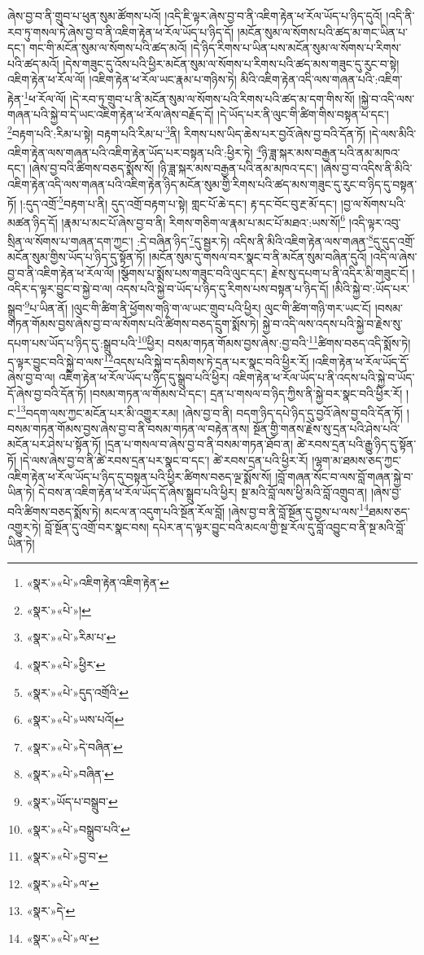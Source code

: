 ཞེས་བྱ་བ་ནི་གྲུབ་པ་ཕུན་སུམ་ཚོགས་པའོ། །འདི་ཇི་ལྟར་ཞེས་བྱ་བ་ནི་འཇིག་རྟེན་ཕ་རོལ་ཡོད་པ་ཉིད་དུའོ། །འདི་ནི་རབ་ཏུ་གསལ་ཏེ་ཞེས་བྱ་བ་ནི་འཇིག་རྟེན་ཕ་རོལ་ཡོད་པ་ཉིད་དོ། །མངོན་སུམ་ལ་སོགས་པའི་ཚད་མ་གང་ཡིན་པ་དང་། གང་གི་མངོན་སུམ་ལ་སོགས་པའི་ཚད་མའོ། །དེ་ཉིད་རིགས་པ་ཡིན་པས་མངོན་སུམ་ལ་སོགས་པ་རིགས་པའི་ཚད་མའོ། །དེས་གཟུང་དུ་འོས་པའི་ཕྱིར་མངོན་སུམ་ལ་སོགས་པ་རིགས་པའི་ཚད་མས་གཟུང་དུ་རུང་བ་སྟེ། འཇིག་རྟེན་ཕ་རོལ་ལོ། །འཇིག་རྟེན་ཕ་རོལ་ཡང་རྣམ་པ་གཉིས་ཏེ། མིའི་འཇིག་རྟེན་འདི་ལས་གཞན་པའི་:འཇིག་རྟེན་\footnote{«སྣར་»«པེ་»འཇིག་རྟེན་འཇིག་རྟེན་}ཕ་རོལ་ལོ། །དེ་རབ་ཏུ་གྲུབ་པ་ནི་མངོན་སུམ་ལ་སོགས་པའི་རིགས་པའི་ཚད་མ་དག་གིས་སོ། །སྐྱེ་བ་འདི་ལས་གཞན་པའི་སྐྱེ་བ་དེ་ཡང་འཇིག་རྟེན་ཕ་རོལ་ཞེས་བརྗོད་དོ། །དེ་ཡོད་པར་ནི་ལུང་གི་ཚིག་གིས་བསྟན་པ་དང་། \footnote{«སྣར་»«པེ་»།  }བརྟག་པའི་:རིམ་པ་སྟེ། བརྟག་པའི་རིམ་པ་\footnote{«སྣར་»«པེ་»རིམ་པ་}ནི། རིགས་པས་ཡིད་ཆེས་པར་བྱའོ་ཞེས་བྱ་བའི་དོན་ཏོ། །དེ་ལས་མིའི་འཇིག་རྟེན་ལས་གཞན་པའི་འཇིག་རྟེན་ཡོད་པར་བསྟན་པའི་:ཕྱིར་ཏེ། \footnote{«སྣར་»«པེ་»ཕྱིར་}ཉི་ཟླ་སྐར་མས་བརྒྱན་པའི་ནམ་མཁའ་དང་། །ཞེས་བྱ་བའི་ཚིགས་བཅད་སྨོས་སོ། །ཉི་ཟླ་སྐར་མས་བརྒྱན་པའི་ནམ་མཁའ་དང་། །ཞེས་བྱ་བ་འདིས་ནི་མིའི་འཇིག་རྟེན་འདི་ལས་གཞན་པའི་འཇིག་རྟེན་ཉིད་མངོན་སུམ་གྱི་རིགས་པའི་ཚད་མས་གཟུང་དུ་རུང་བ་ཉིད་དུ་བསྟན་ཏོ། །:དུད་འགྲོ་\footnote{«སྣར་»«པེ་»དུད་འགྲོའི་}བརྟག་པ་ནི། དུད་འགྲོ་བརྟག་པ་སྟེ། གླང་པོ་ཆེ་དང་། རྟ་དང་བོང་བུ་རྔ་མོ་དང་། །བྱ་ལ་སོགས་པའི་མཚན་ཉིད་དོ། །རྣམ་པ་མང་པོ་ཞེས་བྱ་བ་ནི། རིགས་གཅིག་ལ་རྣམ་པ་མང་པོ་མཐའ་:ཡས་སོ།\footnote{«སྣར་»«པེ་»ཡས་པའོ།} །འདི་ལྟར་འབུ་སྲིན་ལ་སོགས་པ་གཞན་དག་ཀྱང་། :དེ་བཞིན་ཉིད་\footnote{«སྣར་»«པེ་»དེ་བཞིན་}དུ་སྦྱར་ཏེ། འདིས་ནི་མིའི་འཇིག་རྟེན་ལས་གཞན་\footnote{«སྣར་»«པེ་»བཞིན་}དུ་དུད་འགྲོ་མངོན་སུམ་གྱིས་ཡོད་པ་ཉིད་དུ་སྟོན་ཏོ། །མངོན་སུམ་དུ་གསལ་བར་སྣང་བ་ནི་མངོན་སུམ་བཞིན་དུའོ། །འདི་ལ་ཞེས་བྱ་བ་ནི་འཇིག་རྟེན་ཕ་རོལ་ལོ། །སྩོགས་པ་སྨོས་པས་གཟུང་བའི་ལུང་དང་། རྗེས་སུ་དཔག་པ་ནི་འདིར་མི་གཟུང་ངོ། །འདིར་ད་ལྟར་བྱུང་བ་སྐྱེ་བ་ལ། འདས་པའི་སྐྱེ་བ་ཡོད་པ་ཉིད་དུ་རིགས་པས་བསྟན་པ་ཉིད་དོ། །མིའི་སྐྱེ་བ་:ཡོད་པར་སྒྲུབ་\footnote{«སྣར་»ཡོད་པ་བསྒྲུབ་}པ་ཡིན་ནོ། །ལུང་གི་ཚིག་ནི་ཕྱོགས་གཉི་ག་ལ་ཡང་གྲུབ་པའི་ཕྱིར། ལུང་གི་ཚིག་གཉི་གར་ཡང་ངོ། །བསམ་གཏན་གོམས་བྱས་ཞེས་བྱ་བ་ལ་སོགས་པའི་ཚིགས་བཅད་དྲུག་སྨོས་ཏེ། སྐྱེ་བ་འདི་ལས་འདས་པའི་སྐྱེ་བ་རྗེས་སུ་དཔག་པས་ཡོད་པ་ཉིད་དུ་:སྒྲུབ་པའི་\footnote{«སྣར་»«པེ་»བསྒྲུབ་པའི་}ཕྱིར། བསམ་གཏན་གོམས་བྱས་ཞེས་:བྱ་བའི་\footnote{«སྣར་»«པེ་»བྱ་བ་}ཚིགས་བཅད་འདི་སྨོས་ཏེ། ད་ལྟར་བྱུང་བའི་སྐྱེ་བ་ལས་\footnote{«སྣར་»«པེ་»ལ་}འདས་པའི་སྐྱེ་བ་དམིགས་ཏེ་དྲན་པར་སྣང་བའི་ཕྱིར་རོ། །འཇིག་རྟེན་ཕ་རོལ་ཡོད་དོ་ཞེས་བྱ་བ་ལ། འཇིག་རྟེན་ཕ་རོལ་ཡོད་པ་ཉིད་དུ་སྒྲུབ་པའི་ཕྱིར། འཇིག་རྟེན་ཕ་རོལ་ཡོད་པ་ནི་འདས་པའི་སྐྱེ་བ་ཡོད་དོ་ཞེས་བྱ་བའི་དོན་ཏོ། །བསམ་གཏན་ལ་གོམས་པ་དང་། དྲན་པ་གསལ་བ་ཉིད་ཀྱིས་ནི་སྐྱེ་བར་སྣང་བའི་ཕྱིར་རོ། །ང་\footnote{«སྣར་»དེ་}བདག་ལས་ཀྱང་མངོན་པར་མི་འགྱུར་རམ། །ཞེས་བྱ་བ་ནི། བདག་ཉིད་དཔེ་ཉིད་དུ་བྱའོ་ཞེས་བྱ་བའི་དོན་ཏོ། །བསམ་གཏན་གོམས་བྱས་ཞེས་བྱ་བ་ནི་བསམ་གཏན་ལ་བརྟེན་ནས། སྔོན་གྱི་གནས་རྗེས་སུ་དྲན་པའི་ཤེས་པའི་མངོན་པར་ཤེས་པ་སྟོན་ཏོ། །དྲན་པ་གསལ་བ་ཞེས་བྱ་བ་ནི་བསམ་གཏན་ཐོབ་ན། ཚེ་རབས་དྲན་པའི་རྒྱུ་ཉིད་དུ་སྟོན་ཏོ། །དེ་ལས་ཞེས་བྱ་བ་ནི་ཚེ་རབས་དྲན་པར་སྣང་བ་དང་། ཚེ་རབས་དྲན་པའི་ཕྱིར་རོ། །ལྷག་མ་ཐམས་ཅད་ཀྱང་འཇིག་རྟེན་ཕ་རོལ་ཡོད་པ་ཉིད་དུ་བསྟན་པའི་ཕྱིར་ཚིགས་བཅད་ལྔ་སྨོས་སོ། །བློ་གཞན་སོང་བ་ལས་བློ་གཞན་སྐྱེ་བ་ཡིན་ཏེ། དེ་བས་ན་འཇིག་རྟེན་ཕ་རོལ་ཡོད་དོ་ཞེས་སྒྲུབ་པའི་ཕྱིར། སྔ་མའི་བློ་ལས་ཕྱི་མའི་བློ་འགྲུབ་ན། །ཞེས་བྱ་བའི་ཚིགས་བཅད་སྨོས་ཏེ། མངལ་ན་འདུག་པའི་སྔོན་རོལ་བློ། །ཞེས་བྱ་བ་ནི་བློ་སྔོན་དུ་བྱས་པ་ལས་\footnote{«སྣར་»«པེ་»ལ་}ཐམས་ཅད་འགྱུར་ཏེ། བློ་སྔོན་དུ་འགྲོ་བར་སྣང་བས། དཔེར་ན་ད་ལྟར་བྱུང་བའི་མངལ་གྱི་སྔ་རོལ་དུ་བློ་འབྱུང་བ་ནི་སྔ་མའི་བློ་ཡིན་ཏེ། 